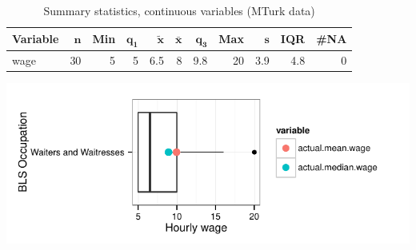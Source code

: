 \documentclass[a4paper,10pt]{article}\usepackage[]{graphicx}\usepackage[]{color}
\makeatletter
\def\maxwidth{ %
  \ifdim\Gin@nat@width>\linewidth
    \linewidth
  \else
    \Gin@nat@width
  \fi
}
\makeatother
\begin{document}
\begin{table}[ht]
\centering
{\footnotesize
\begin{tabular}{lrrrrrrrrrr}
 \textbf{Variable} & $\mathbf{n}$ & \textbf{Min} & $\mathbf{q_1}$ & $\mathbf{\widetilde{x}}$ & $\mathbf{\bar{x}}$ & $\mathbf{q_3}$ & \textbf{Max} & $\mathbf{s}$ & \textbf{IQR} & \textbf{\#NA} \\ 
  \hline
wage & 30 & 5 & 5 & 6.5 & 8 & 9.8 & 20 & 3.9 & 4.8 & 0 \\ 
  \end{tabular}
}
\caption{Summary statistics, continuous variables (MTurk data)} 
\label{tab2:35-3030}
\end{table}


{\centering \includegraphics[width=\maxwidth]{figure/unnamed-chunk-211} 

}
\end{document}
